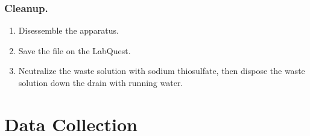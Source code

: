 \documentclass[hyphens]{article}
\begin{document}
\subsubsection{Cleanup.}
\label{sec:research-design-procedure-cleanup}
\begin{enumerate}
  \item Disessemble the apparatus.
  \item Save the file on the LabQuest.
  \item Neutralize the waste solution with sodium thiosulfate, then dispose the waste solution down the drain with running water.
\end{enumerate}


\section{Data Collection}
\label{sec:data-collection}

\end{document}
